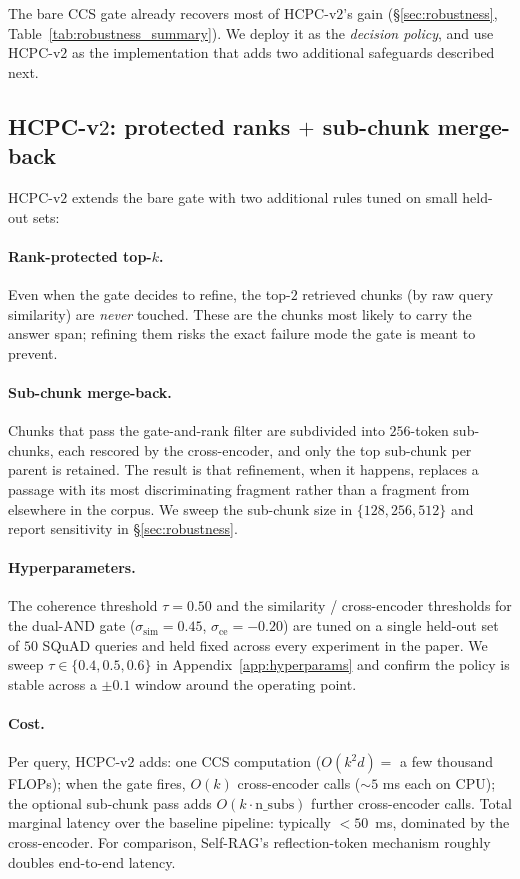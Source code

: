 The bare CCS gate already recovers most of HCPC-v$2$'s gain
(\S\ref{sec:robustness}, Table~\ref{tab:robustness_summary}). We deploy it as the
\emph{decision policy}, and use HCPC-v$2$ as the implementation that
adds two additional safeguards described next.

\subsection{HCPC-v$2$: protected ranks $+$ sub-chunk merge-back}
\label{sec:method:hcpc_v2}

HCPC-v$2$ extends the bare gate with two additional rules tuned on
small held-out sets:

\paragraph{Rank-protected top-$k$.}
Even when the gate decides to refine, the top-$2$ retrieved chunks
(by raw query similarity) are \emph{never} touched. These are the
chunks most likely to carry the answer span; refining them risks the
exact failure mode the gate is meant to prevent.

\paragraph{Sub-chunk merge-back.}
Chunks that pass the gate-and-rank filter are subdivided into
$256$-token sub-chunks, each rescored by the cross-encoder, and only
the top sub-chunk per parent is retained. The result is that
refinement, when it happens, replaces a passage with its most
discriminating fragment rather than a fragment from elsewhere in the
corpus. We sweep the sub-chunk size in $\{128, 256, 512\}$ and report
sensitivity in \S\ref{sec:robustness}.

\paragraph{Hyperparameters.}
The coherence threshold $\tau = 0.50$ and the similarity / cross-encoder
thresholds for the dual-AND gate ($\sigma_{\textrm{sim}} = 0.45$,
$\sigma_{\textrm{ce}} = -0.20$) are tuned on a single held-out
set of $50$ SQuAD queries and held fixed across every experiment in the
paper. We sweep $\tau \in \{0.4, 0.5, 0.6\}$ in
Appendix~\ref{app:hyperparams} and confirm the policy is stable
across a $\pm 0.1$ window around the operating point.

\paragraph{Cost.}
Per query, HCPC-v$2$ adds: one CCS computation
($O(k^2 d) = $ a few thousand FLOPs); when the gate fires, $O(k)$
cross-encoder calls ($\sim 5$ ms each on CPU); the optional
sub-chunk pass adds $O(k \cdot \textrm{n\_subs})$ further cross-encoder
calls. Total marginal latency over the baseline pipeline: typically
$<50$~ms, dominated by the cross-encoder. For comparison, Self-RAG's
reflection-token mechanism roughly doubles end-to-end latency.

